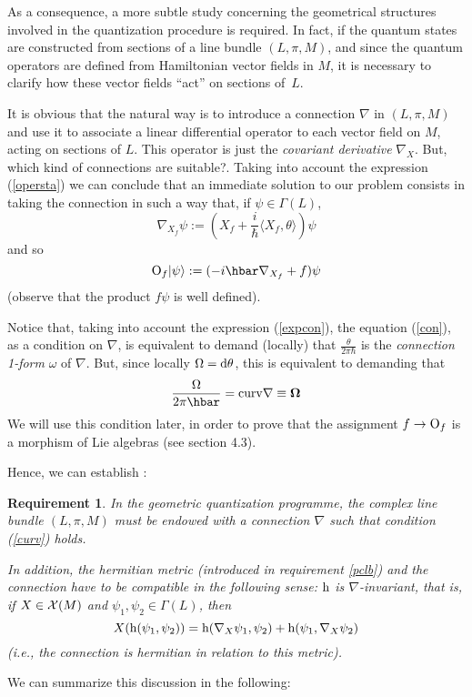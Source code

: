 \documentclass[12pt]{article}
\theoremstyle{plain}
\newtheorem{require}{Requirement}
\def\beq{\begin{equation}}
\def\eeq{\end{equation}}
\def\dst{\(}
\def\d{{\rm d}}
\def\sta{|\psi \rangle }
\def\Op{{\rm O}}
\def\h{{\rm h}}
\def\curv{{\bf \Omega}}
\begin{document}
As a consequence,
a more subtle study concerning the
geometrical structures involved in the
quantization procedure is required.
In fact, if the quantum states are constructed from
sections of a line bundle $(L,\pi ,M)$,
and since the quantum operators
are defined from Hamiltonian vector fields in $M$,
it is necessary to clarify how
these vector fields ``act'' on sections of~$L$.

It is obvious that the natural way
is to introduce a connection $\nabla$
in $(L,\pi ,M)$
and use it to associate a
linear differential operator to each
vector field on $M$, acting on sections of $L$.
This operator is just the
{\it covariant derivative}
$\nabla_X$.
But, which kind of connections are suitable?.
Taking into account the expression
(\ref{opersta})
we can conclude that an immediate
solution to our problem consists in taking
the connection in such a way that,
if $\psi \in \Gamma (L)$,
\beq
\nabla_{X_f}\psi :=
(X_f + \frac{i}{\hbar}\langle X_f,\theta \rangle )\psi
\label{con}
\eeq
and so
$$
\Op_f\sta :=
(-i\hbar \nabla_{X_f} + f)\psi
$$
(observe that the product $f\psi$ is well defined).

Notice that, taking into account the expression (\ref{expcon}),
the equation (\ref{con}), as a condition on $\nabla$,
is equivalent to demand (locally) that
\dst\frac{\theta}{2\pi \hbar}\)
is the {\it connection 1-form} $\omega$ of $\nabla$.
But, since locally $\Omega=\d \theta$,
this is equivalent to demanding that
\beq
\frac{\Omega}{2\pi\hbar} = {\rm curv} \nabla \equiv \curv
\label{curv}
\eeq
We will use this condition later, in order to prove that the assignment
$f \to \Op_f$ is a morphism of Lie algebras (see section 4.3).

Hence, we can establish
\cite{SW-76}:

\begin{require}
In the geometric quantization programme,
the complex line bundle
$(L,\pi ,M)$
must be endowed with a
{\rm connection} $\nabla$
such that condition
(\ref{curv})
holds.

In addition, the hermitian metric
(introduced in requirement \ref{pclb})
and the connection have to be {\rm compatible}
in the following sense: $\h$ is $\nabla$-invariant, that is,
if $X \in {\cal X}(M)$ and $\psi_1,\psi_2 \in \Gamma (L)$, then
$$
X(\h (\psi_1,\psi_2)) =
\h (\nabla_X\psi_1,\psi_2) +
\h (\psi_1,\nabla_X\psi_2)
$$
(i.e., the connection is hermitian in relation to this metric).
\label{connec}
\end{require}

We can summarize this discussion in the following:
\end{document}
